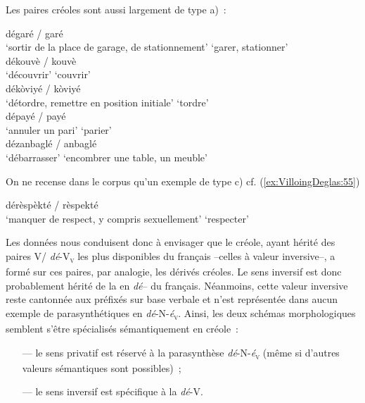 \documentclass[output=paper]{langsci/langscibook}
\begin{document}
Les paires créoles sont aussi largement de type a)~:

\ea \label{ex:VilloingDeglas:54}
      \ea \gll dégaré  / garé\\
  {`sortir de la place de garage, de stationnement'} {} {`garer, stationner'}\\
      \ex \gll  dékouvè / kouvè\\
        {`découvrir'} {} {`couvrir'}\\
      \ex \gll  dékòviyé / kòviyé\\
        {`détordre, remettre en position initiale'} {} {`tordre'}\\
      \ex \gll  dépayé / payé\\
        {`annuler un pari'} {} {`parier'}\\
      \ex \gll  dézanbaglé / anbaglé\\
        {`débarrasser'} {} {`encombrer une table, un meuble'}\\
\z\z


On ne recense dans le corpus qu'un exemple de type c) cf. (\ref{ex:VilloingDeglas:55})

\ea \label{ex:VilloingDeglas:55}
 \gll dérèspèkté / rèspekté\\
 {`manquer de respect, y compris sexuellement'} {}   `respecter'\\
\z

Les données nous conduisent donc à envisager que le créole, ayant hérité
des paires V/ \emph{dé}-V\textsubscript{\textsc{v}} les plus disponibles du français
--celles à valeur inversive--, a formé sur ces paires, par analogie, les
dérivés créoles. Le sens inversif est donc probablement hérité de la
 en \emph{dé}-- du français. Néanmoins, cette valeur inversive
reste cantonnée aux préfixés sur base verbale et n'est représentée dans
aucun exemple de parasynthétiques en \emph{dé}-N-\emph{é}\textsubscript{\textsc{v}}. Ainsi, les
deux schémas morphologiques semblent s'être spécialisés sémantiquement
en créole~:

\begin{itemize}

\item[---]
  le sens privatif est réservé à la parasynthèse \emph{dé}-N-\emph{é}\textsubscript{\textsc{v}}
  (même si d'autres valeurs sémantiques sont possibles)~;
\item[---]
  le sens inversif est spécifique à la  \emph{dé}-V.
\end{itemize}
\end{document}
